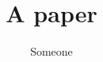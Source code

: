 \documentclass[journal]{IEEEtran}
\begin{document}
\title{A paper}
\date{\vspace{-5ex}}
\author{Someone}
\maketitle






\end{document}

